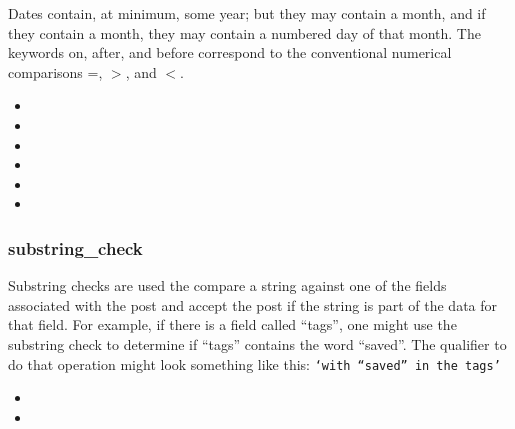 Dates contain, at minimum, some year; but they may contain a month, and if they contain a month, they may contain a numbered day of
that month. The keywords on, after, and before correspond to the conventional numerical comparisons =, $>$, and $<$.
\begin{itemize}[leftmargin=2in]
    \item[\nonterminal{qualifier}] \bnf{:} 
    \item[\nonterminal{date\_check}] \bnf{:}  \bnf{(} \bnf{|}  \bnf{|} \bnf{)}
    \item[\nonterminal{date}] \bnf{:} \bnf{(}     
    \item[\nonterminal{year}] \bnf{:} 
    \item[\nonterminal{month}] \bnf{:}  \bnf{|}  \bnf{|}  \bnf{|}  \bnf{|}  \bnf{|}  \bnf{|}  \bnf{|}  \bnf{|}  \bnf{|}  \bnf{|}  \bnf{|} 
    \item[\nonterminal{day}] \bnf{:} \bnf{[0-3]}  
\end{itemize}

\subsubsection{substring\_check}
Substring checks are used the compare a string against one of the fields associated with the post and accept the post if the string is part
of the data for that field. For example, if there is a field called “tags”, one might use the substring check to determine if “tags”
contains the word “saved”. The qualifier to do that operation might look something like this: \texttt{‘with “saved” in the tags’}
\begin{itemize}[leftmargin=2in]
    \item[\nonterminal{qualifier}] \bnf{:} 
    \item[\nonterminal{substring\_check}] \bnf{:}  
\end{itemize}

